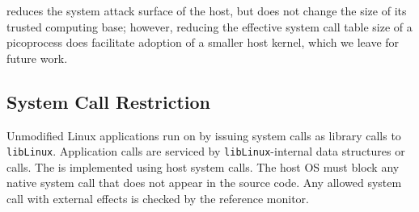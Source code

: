 
\sysname{} reduces the system attack surface of the host, but does not change the size of its
trusted computing base; however, reducing the effective system call table
size of a picoprocess does facilitate adoption of a smaller host kernel,
which we leave for future work.

\subsection{System Call Restriction}
\label{sec:graphene:security:syscalls}


Unmodified Linux applications run on \sysname{} by issuing 
system calls as library calls to {\tt libLinux}.
Application calls are serviced by {\tt libLinux}-internal data structures
or \pal{} calls.
The \pal{} is implemented using \nativecalls{} host system calls.
The host OS must block any 
native system call that 
does not appear in the \pal{} source code.
Any allowed system call with external effects is checked by 
the reference monitor.








